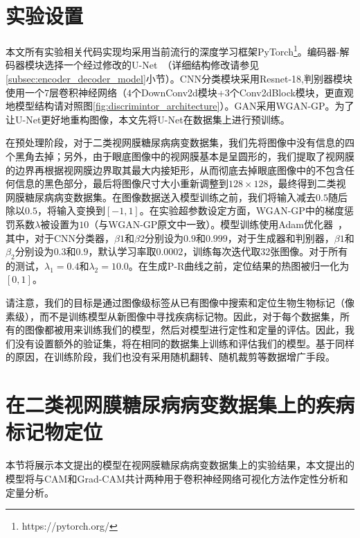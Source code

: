 \section{实验设置}\label{sec:exper_setting}

本文所有实验相关代码实现均采用当前流行的深度学习框架PyTorch\footnote{https://pytorch.org/}。编码器-解码器模块选择一个经过修改的U-Net~\cite{iglovikov2018ternausnet}（详细结构修改请参见\ref{subsec:encoder_decoder_model}小节）。CNN分类模块采用Resnet-18,判别器模块使用一个$7$层卷积神经网络（$4$个DownConv2d模块+$3$个Conv2dBlock模块，更直观地模型结构请对照图\ref{fig:discrimintor_architecture}）。GAN采用WGAN-GP。为了让U-Net更好地重构图像，本文先将U-Net在数据集上进行预训练。

在预处理阶段，对于二类视网膜糖尿病病变数据集，我们先将图像中没有信息的四个黑角去掉；另外，由于眼底图像中的视网膜基本是呈圆形的，我们提取了视网膜的边界再根据视网膜边界取其最大内接矩形，从而彻底去掉眼底图像中的不包含任何信息的黑色部分，最后将图像尺寸大小重新调整到$128\times128$，最终得到二类视网膜糖尿病病变数据集。在图像数据送入模型训练之前，我们将输入减去$0.5$随后除以$0.5$，将输入变换到$[-1,1]$。在实验超参数设定方面，WGAN-GP中的梯度惩罚系数$\lambda$被设置为$10$（与WGAN-GP原文中一致）。模型训练使用Adam优化器~\cite{kingma2014adam}，其中，对于CNN分类器，$\beta1$和$\beta2$分别设为$0.9$和$0.999$，对于生成器和判别器，$\beta1$和$\beta_2$分别设为$0.3$和$0.9$，默认学习率取$0.0002$，训练每次迭代取32张图像。对于所有的测试，$\lambda_1 = 0.4$和$\lambda_{2} = 10.0$。在生成P-R曲线之前，定位结果的热图被归一化为$[0,1]$。


请注意，我们的目标是通过图像级标签从已有图像中搜索和定位生物生物标记（像素级），而不是训练模型从新图像中寻找疾病标记物。因此，对于每个数据集，所有的图像都被用来训练我们的模型，然后对模型进行定性和定量的评估。因此，我们没有设置额外的验证集，将在相同的数据集上训练和评估我们的模型。基于同样的原因，在训练阶段，我们也没有采用随机翻转、随机裁剪等数据增广手段。

\section{在二类视网膜糖尿病病变数据集上的疾病标记物定位}\label{sec:bin_dr_ds_experiment}
本节将展示本文提出的模型在视网膜糖尿病病变数据集上的实验结果，本文提出的模型将与CAM和Grad-CAM共计两种用于卷积神经网络可视化方法作定性分析和定量分析。

